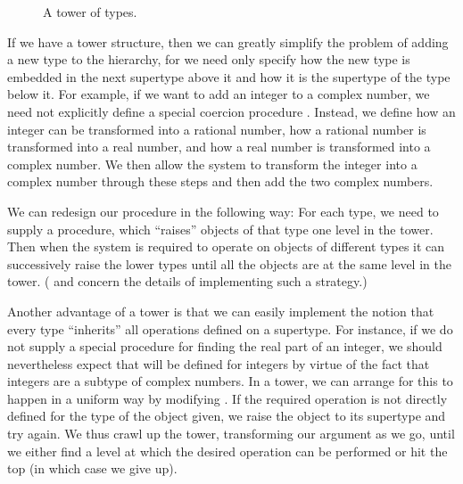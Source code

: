 \begin{figure}[tb]
\label{Figure 2.25}
\centering
\begin{comment}
\heading{Figure 2.25:} A tower of types.

\begin{example}
 complex
   ^
   |
  real
   ^
   |
rational
   ^
   |
integer
\end{example}
\end{comment}

\par\bigskip
\noindent
{} A tower of types.
\end{figure}

If we have a tower structure, then we can greatly simplify the problem of
adding a new type to the hierarchy, for we need only specify how the new type
is embedded in the next supertype above it and how it is the supertype of the
type below it.  For example, if we want to add an integer to a complex number,
we need not explicitly define a special coercion procedure
.  Instead, we define how an integer can be transformed
into a rational number, how a rational number is transformed into a real
number, and how a real number is transformed into a complex number.  We then
allow the system to transform the integer into a complex number through these
steps and then add the two complex numbers.

We can redesign our  procedure in the following way: For
each type, we need to supply a  procedure, which ``raises'' objects
of that type one level in the tower.  Then when the system is required to
operate on objects of different types it can successively raise the lower types
until all the objects are at the same level in the tower.  (
and  concern the details of implementing such a strategy.)

Another advantage of a tower is that we can easily implement the notion that
every type ``inherits'' all operations defined on a supertype.  For instance,
if we do not supply a special procedure for finding the real part of an
integer, we should nevertheless expect that  will be defined
for integers by virtue of the fact that integers are a subtype of complex
numbers.  In a tower, we can arrange for this to happen in a uniform way by
modifying .  If the required operation is not directly
defined for the type of the object given, we raise the object to its supertype
and try again.  We thus crawl up the tower, transforming our argument as we go,
until we either find a level at which the desired operation can be performed or
hit the top (in which case we give up).

